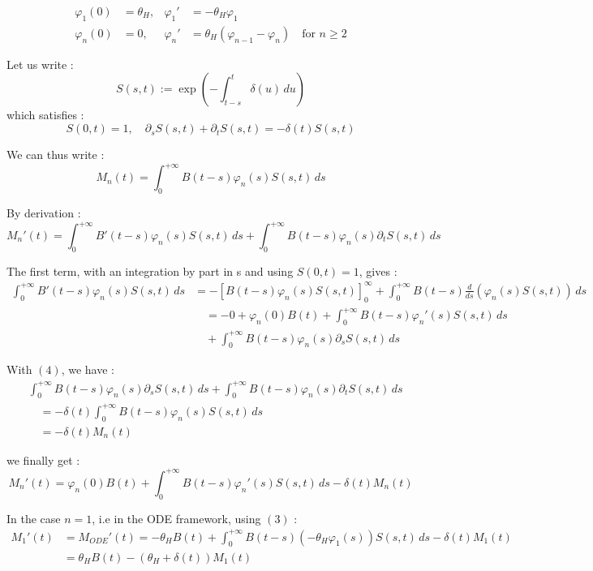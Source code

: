 \documentclass[12pt,a4paper,onecolumn]{article}
\begin{document}
\begin{align}
\varphi_1(0) &= \theta_H, & \varphi_1' &= -\theta_H \varphi_1 \\
\varphi_n(0) &= 0, & \varphi_n' &= \theta_H (\varphi_{n-1} - \varphi_n) \quad \text{for } n \geq 2
\end{align}

Let us write :
\[
S(s, t) := \exp\left( -\int_{t-s}^{t} \delta(u) \, du \right)
\]
which satisfies :
\begin{equation}
S(0, t) = 1, \quad \partial_s S(s,t) + \partial_t S(s,t) = -\delta(t) S(s,t)
\end{equation}

We can thus write :
\begin{equation}
M_n(t) = \int_0^{+\infty} B(t-s)\varphi_n(s)S(s,t) \, ds
\end{equation}

By derivation :
\[
M_n'(t) = \int_0^{+\infty} B'(t-s)\varphi_n(s)S(s,t) \, ds + \int_0^{+\infty} B(t-s)\varphi_n(s) \partial_t S(s,t) \, ds
\]

The first term, with an integration by part in s and using $S(0,t) = 1$, gives :
\begin{align*}
\int_0^{+\infty} B'(t-s)\varphi_n(s)S(s,t) \, ds &= -[B(t-s) \varphi_n(s) S(s,t) ]_{0}^{\infty} + \int_0^{+\infty} B(t-s)\frac{d}{ds}(\varphi_n(s)S(s,t)) \, ds \\
&\quad = -0 + \varphi_n(0) B(t) + \int_0^{+\infty} B(t-s)\varphi_n'(s) S(s,t) \, ds \\
&\quad + \int_0^{+\infty} B(t-s)\varphi_n(s) \partial_s S(s,t) \, ds
\end{align*}

With $(4)$, we have :
\begin{align*}
&\int_0^{+\infty} B(t-s)\varphi_n(s) \partial_s S(s,t) \, ds  + \int_0^{+\infty} B(t-s)\varphi_n(s) \partial_t S(s,t) \, ds \\
&\quad = - \delta(t) \int_0^{+\infty} B(t-s)\varphi_n(s) S(s,t)  \, ds \\
&\quad = - \delta(t) M_n(t)
\end{align*}

we finally get :
\[
M_n'(t) = \varphi_n(0) B(t) + \int_0^{+\infty} B(t-s)\varphi_n'(s) S(s,t) \, ds - \delta(t) M_n(t)
\]

In the case $n = 1$, i.e in the ODE framework, using $(3)$ : 
\begin{align*}
M_{1}'(t) &= M_{ODE}'(t)= -\theta_H B(t) + \int_0^{+\infty} B(t-s)(-\theta_H \varphi_1(s)) S(s,t) \, ds - \delta(t) M_1(t) \\
&= \theta_H B(t) - (\theta_H + \delta(t)) M_1(t)
\end{align*}
\end{document}
